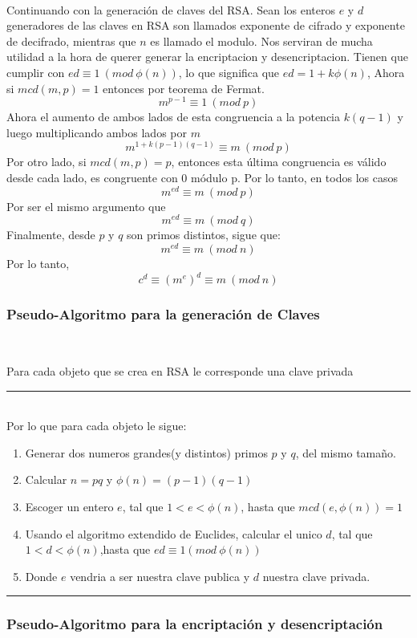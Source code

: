 \documentclass[11pt, conference]{IEEEtran}
\begin{document}
\

Continuando con la generación de claves del RSA. Sean los enteros $e$ y $d$ generadores de las claves en RSA son llamados exponente de cifrado y exponente de decifrado, mientras que $n$ es llamado el modulo. Nos serviran de mucha utilidad a la hora de querer generar la encriptacion y desencriptacion. Tienen que cumplir con $ed \equiv 1\ (mod\ \phi(n))$, lo que significa que $ed = 1+k\phi(n)$, Ahora si $mcd(m,p) = 1$ entonces por teorema de Fermat.
\[m^{p-1}\equiv 1\ (mod\ p)\]
Ahora el aumento de ambos lados de esta congruencia a la potencia $k(q-1)$ y luego multiplicando ambos lados por $m$
\[m^{1+k(p-1)(q-1)}\equiv m\ (mod\ p)\]
Por otro lado, si $mcd (m, p) = p$, entonces esta última congruencia es válido desde cada lado, es congruente con 0 módulo p. Por lo tanto, en todos los casos
\[m^{ed}\equiv m\ (mod\ p)\]
Por ser el mismo argumento que
\[m^{ed}\equiv m\ (mod\ q)\]
Finalmente, desde $p$ y $q$ son primos distintos, sigue que:
\[m^{ed} \equiv m\ (mod\ n) \]
Por lo tanto,
\[c^d\equiv(m^e)^d\equiv m\ (mod\ n)\]

\subsubsection[Pseudo-Algoritmo para la generación de Claves]{\textbf{Pseudo-Algoritmo para la generación de Claves}}

\

Para cada objeto que se crea en RSA le corresponde una clave privada\\
\rule[0mm]{181mm}{0.1mm}\\
Por lo que para cada objeto le sigue:
\begin{enumerate}
	\item Generar dos numeros grandes(y distintos) primos $p$ y $q$, del mismo tamaño.
	\item Calcular $n = pq$ y $\phi(n) = (p-1)(q-1)$
	\item Escoger un entero $e$, tal que  $1<e<\phi(n)$, hasta que $mcd(e,\phi(n))=1$
	\item Usando el algoritmo extendido de Euclides, calcular el unico $d$, tal que $1<d<\phi(n)$,hasta que  $ed\equiv 1(mod\ \phi(n) )$ 
	\item Donde $e$ vendria a ser nuestra clave publica y $d$ nuestra clave privada. 
\end{enumerate}
\rule[3mm]{181mm}{0.1mm}

\subsubsection[Pseudo-Algoritmo para la encriptación y desencriptación]{\textbf{Pseudo-Algoritmo para la encriptación y desencriptación}}
\end{document}
